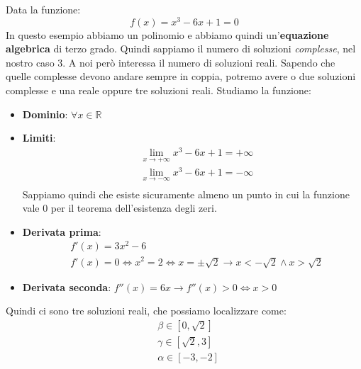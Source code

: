 \begin{example}
	Data la funzione:
	\begin{equation}
		f(x)= x^3 -6x +1 = 0
	\end{equation}
	In questo esempio abbiamo un polinomio e abbiamo quindi un'\textbf{equazione algebrica} di terzo grado. Quindi sappiamo il numero di soluzioni \textit{complesse}, nel nostro caso $3$. A noi però interessa il numero di soluzioni reali. Sapendo che quelle complesse devono andare sempre in coppia, potremo avere o due soluzioni complesse e una reale oppure tre soluzioni reali. Studiamo la funzione:
	\begin{itemize}
		\item \textbf{Dominio}: $\forall x \in \mathbb{R}$
		\item \textbf{Limiti}:
		\begin{align*}
			& \lim_{x \to + \infty} x^3 -6x +1 = + \infty\\
			& \lim_{x \to - \infty} x^3 -6x +1 = - \infty\\
		\end{align*}
		Sappiamo quindi che esiste sicuramente almeno un punto in cui la funzione vale $0$ per il teorema dell'esistenza degli zeri.
		\item \textbf{Derivata prima}: \begin{align*}
			& f'(x) = 3x^2-6 \\
			& f'(x) = 0 \Leftrightarrow x^2 = 2 \Leftrightarrow x = \pm \sqrt{2} \to x < -\sqrt{2} \land x > \sqrt{2}
		\end{align*}
		\item \textbf{Derivata seconda}: $f''(x)=6x \to f''(x) > 0 \Leftrightarrow x>0$
	\end{itemize}
	\begin{center}
	\end{center}
	Quindi ci sono tre soluzioni reali, che possiamo localizzare come:
	\begin{align*}
		& \beta \in [0, \sqrt{2}]\\
		& \gamma \in [\sqrt{2}, 3]\\
		& \alpha \in [-3,-2]
	\end{align*}
\end{example}
\newpage

